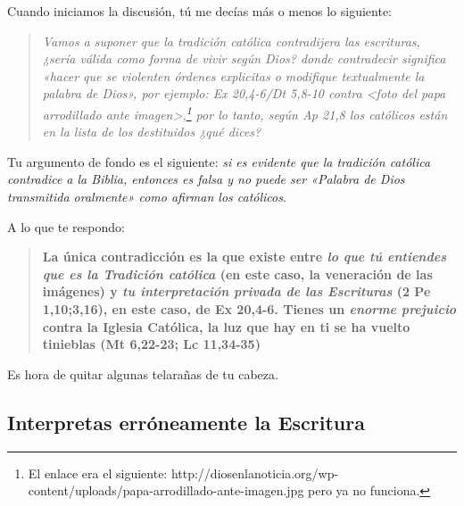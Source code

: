 \documentclass{article}
\begin{document}
Cuando iniciamos la discusión, tú me decías más o menos lo siguiente:

\begin{quote}
\emph{Vamos a suponer que la tradición católica contradijera las escrituras, ¿sería válida como forma de vivir según Dios? donde \emph{contradecir} significa «hacer que se violenten órdenes explicitas o modifique textualmente la palabra de Dios», por ejemplo: Ex 20,4-6/Dt 5,8-10 contra  <foto del papa arrodillado ante imagen>,\footnote{El enlace era el siguiente: http://diosenlanoticia.org/wp-content/uploads/papa-arrodillado-ante-imagen.jpg pero ya no funciona.} por lo tanto, según Ap 21,8 los católicos están en la lista de los destituidos ¿qué dices?}
\end{quote}

\noindent
Tu argumento de fondo es el siguiente: \emph{si es evidente que la tradición católica contradice a la Biblia, entonces es falsa y no puede ser «Palabra de Dios transmitida oralmente» como afirman los católicos}.

A lo que te respondo:

\begin{quote}
\textbf{La única contradicción es la que existe entre \emph{lo que tú entiendes que es la Tradición católica} (en este caso, la veneración de las imágenes) y \emph{tu interpretación privada de las Escrituras} (2 Pe 1,10;3,16), en este caso, de Ex 20,4-6. Tienes un \emph{enorme prejuicio} contra la Iglesia Católica, la luz que hay en ti se ha vuelto tinieblas (Mt 6,22-23; Lc 11,34-35)}
\end{quote}

\noindent
Es hora de quitar algunas telarañas de tu cabeza.

\subsection*{Interpretas erróneamente la Escritura}
\end{document}
